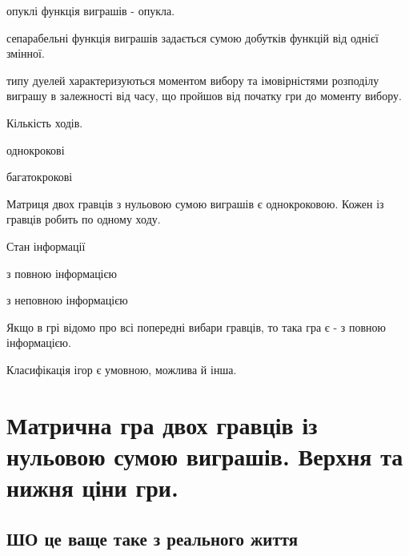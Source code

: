 \documentclass[12pt,a4paper]{article}
\newenvironment{slim_enumerate}{
\begin{enumerate}
  \setlength{\itemsep}{1pt}
  \setlength{\parskip}{0pt}
  \setlength{\parsep}{0pt}}
{\end{enumerate}}
\newenvironment{slim_itemize}{
\begin{itemize}
  \setlength{\itemsep}{1pt}
  \setlength{\parskip}{0pt}
  \setlength{\parsep}{0pt}}
{\end{itemize}}
\newenvironment{slim_description}{
\begin{description}
  \setlength{\itemsep}{1pt}
  \setlength{\parskip}{0pt}
  \setlength{\parsep}{0pt}}
{\end{description}}
\begin{document}
\begin{slim_enumerate}
\begin{slim_description}
    \item[опуклі] функція виграшів - опукла.
    \item[сепарабельні] функція виграшів задається сумою добутків функцій від однієї змінної.
    \item[типу дуелей] характеризуються моментом вибору та імовірністями розподілу виграшу в залежності від часу, що пройшов від початку гри до моменту вибору.
  \end{slim_description}
  \item Кількість ходів.
  \begin{slim_itemize}
    \item однокрокові
    \item багатокрокові
  \end{slim_itemize}
  Матриця двох гравців з нульовою сумою виграшів є однокроковою. Кожен із гравців робить по одному ходу.
  \item Стан інформації
  \begin{slim_itemize}
    \item з повною інформацією
    \item з неповною інформацією
  \end{slim_itemize}
  Якщо в грі відомо про всі попередні вибари гравців, то така гра є - з повною інформацією.
\end{slim_enumerate}

Класифікація ігор є умовною, можлива й інша.

\clearpage

\section{Матрична гра двох гравців із нульовою сумою виграшів. Верхня та нижня ціни гри.}

\subsection*{ШО це ваще таке з реального життя}
\end{document}
